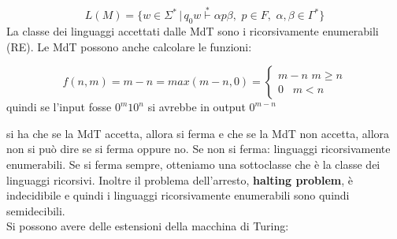 $$L(M)=\{w\in\Sigma^*\,|\,q_0w\stackrel{*}{\vdash}\alpha p\beta,\,\, p\in F,\,\,\alpha,\beta\in\Gamma^*\}$$
La classe dei linguaggi accettati dalle MdT sono i ricorsivamente enumerabili (RE).
Le MdT possono anche calcolare le funzioni:
\begin{example}
$$f(n,m)=m-n=max(m-n,0)=\begin{cases}
  m-n\,\,m\geq n \\
  0\,\,\,\,\,m<n
\end{cases}$$
quindi se l'input fosse $0^m10^n$ si avrebbe in output $0^{m-n}$
\end{example}
si ha che se la MdT accetta, allora si ferma e che se la MdT non accetta, allora non si può dire se si ferma oppure no. Se non si ferma: linguaggi ricorsivamente enumerabili. Se si ferma sempre, otteniamo una sottoclasse che è la classe dei linguaggi ricorsivi. Inoltre il problema dell'arresto, \textbf{halting problem}, è indecidibile e quindi i linguaggi ricorsivamente enumerabili sono quindi semidecibili.\\
Si possono avere delle estensioni della macchina di Turing:
